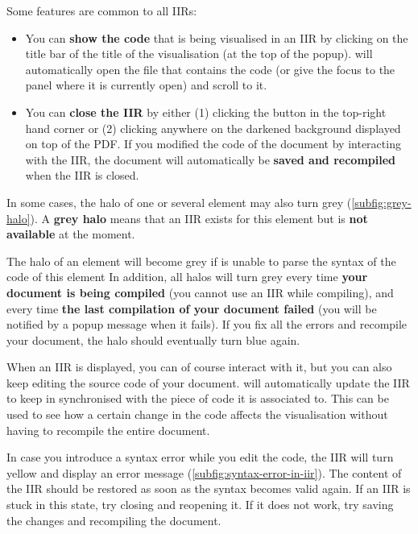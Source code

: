 \documentclass[11pt, a4paper]{article}
\begin{document}
Some features are common to all IIRs:
\begin{itemize}%
    \item You can \textbf{show the code} that is being visualised in an IIR by clicking on the title bar of the title of the visualisation (at the top of the popup). \iLaTeX{} will automatically open the file that contains the code (or give the focus to the panel where it is currently open) and scroll to it.
    \item You can \textbf{close the IIR} by either (1) clicking the button in the top-right hand corner or (2) clicking anywhere on the darkened background displayed on top of the PDF. If you modified the code of the document by interacting with the IIR, the document will automatically be \textbf{saved and recompiled} when the IIR is closed.
\end{itemize}

In some cases, the halo of one or several element may also turn grey (\autoref{subfig:grey-halo}).
A \textbf{grey halo} means that an IIR exists for this element but is \textbf{not available} at the moment.

The halo of an element will become grey if \iLaTeX{} is unable to parse the syntax of the code of this element
In addition, all halos will turn grey every time \textbf{your document is being compiled} (you cannot use an IIR while compiling), and every time \textbf{the last compilation of your document failed} (you will be notified by a popup message when it fails).
If you fix all the errors and recompile your document, the halo should eventually turn blue again.

\begin{info}
    When an IIR is displayed, you can of course interact with it, but you can also keep editing the source code of your document.
    \iLaTeX{} will automatically update the IIR to keep in synchronised with the piece of code it is associated to.
    This can be used to see how a certain change in the code affects the visualisation without having to recompile the entire document.
        
    In case you introduce a syntax error while you edit the code, the IIR will turn yellow and display an error message (\autoref{subfig:syntax-error-in-iir}).
    The content of the IIR should be restored as soon as the syntax becomes valid again.
    If an IIR is stuck in this state, try closing and reopening it.
    If it does not work, try saving the changes and recompiling the document.

\end{info}
\end{document}
